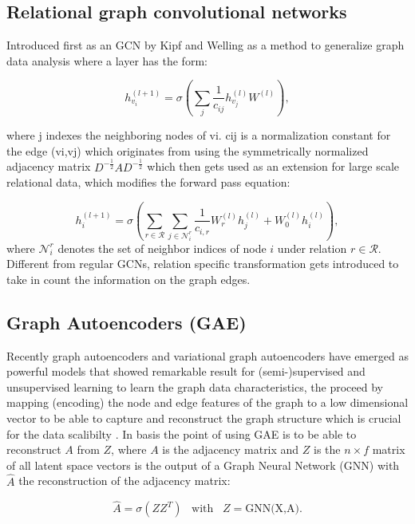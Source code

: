 \documentclass[11pt]{article}
\begin{document}
\subsection{Relational graph convolutional networks}
Introduced first as an GCN by Kipf and Welling \cite{kipf2016semi} as a method to generalize graph data analysis where a layer has the form: 

\begin{equation}
\label{eq:gcn_layer}
    h^{(l+1)}_{v_i} = \sigma \left( \sum_{j} \frac{1}{c_{ij}}h^{(l)}_{v_j}W^{(l)} \right),
\end{equation}

where j indexes the neighboring nodes of vi. cij is a normalization constant for the edge (vi,vj) which originates from using the symmetrically normalized adjacency matrix ${D^{-\frac{1}{2}}AD^{-\frac{1}{2}}}$ which then gets used as an extension for large scale relational data, which modifies the forward pass equation:

\begin{equation}
\label{eq:rgcn_layer}
    h_i^{(l+1)}= \sigma \left( \sum_{r \in \mathcal{R}}\sum_{j \in \mathcal{N}^r_i} \frac{1}{c_{i,r}}W_r^{(l)} h_j^{(l)} + W_0^{(l)}h_i^{(l)} \right),
\end{equation}
 where $\mathcal{N}^r_i$ denotes the set of neighbor indices of node $i$ under relation $r\in\mathcal{R}$. Different from regular GCNs, relation specific transformation gets introduced to take in count the information on the graph edges.
 
\subsection{Graph Autoencoders (GAE)}
Recently graph autoencoders \cite{kipf2016semi} and variational graph autoencoders \cite{kipf2016variational} have emerged as powerful models that showed remarkable result for (semi-)supervised and unsupervised learning to learn the graph data characteristics, the proceed by mapping (encoding) the node and edge features of the graph to a low dimensional vector to be able to capture and reconstruct the graph structure which is crucial for the data scalibilty \cite{EmbedingScalability}. In basis the point of using GAE is to be able to reconstruct $A$ from $Z$, where $A$ is the adjacency matrix and $Z$ is the $n \times f$ matrix of all latent space vectors is the output of a Graph Neural Network (GNN) with $\hat{A}$ the reconstruction of the adjacency matrix:

\begin{equation}
\hat{A} = \sigma(ZZ^T) \hspace{10pt} \text{with} \hspace{10pt} Z = \text{GNN(X,A)}.
\end{equation}
\end{document}
